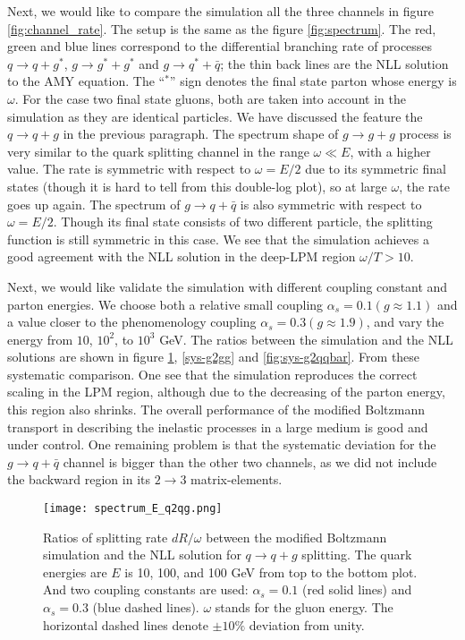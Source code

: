 Next, we would like to compare the simulation all the three channels in figure \ref{fig:channel_rate}.
The setup is the same as the figure \ref{fig:spectrum}.
The red, green and blue lines correspond to the differential branching rate of processes $q\rightarrow q+g^*$, $g\rightarrow g^*+g^*$ and $g\rightarrow q^*+\bar{q}$; the thin back lines are the NLL solution to the AMY equation.
The ``${}^*$'' sign denotes the final state parton whose energy is $\omega$.
For the case two final state gluons, both are taken into account in the simulation as they are identical particles.
We have discussed the feature the $q\rightarrow q+g$ in the previous paragraph. 
The spectrum shape of $g\rightarrow g+g$ process is very similar to the quark splitting channel in the range $\omega \ll E$, with a higher value.
The rate is symmetric with respect to $\omega = E/2$ due to its symmetric final states (though it is hard to tell from this double-log plot), so at large $\omega$, the rate goes up again.
The spectrum of $g\rightarrow q+\bar{q}$ is also symmetric with respect to $\omega = E/2$.
Though its final state consists of two different particle, the splitting function is still symmetric in this case.
We see that the simulation achieves a good agreement with the NLL solution in the deep-LPM region $\omega/T > 10$.

Next, we would like validate the simulation with different coupling constant and parton energies.
We choose both a relative small coupling $\alpha_s = 0.1 (g \approx 1.1)$ and a value closer to the phenomenology coupling $\alpha_s = 0.3 (g \approx 1.9)$, and vary the energy from $10$, $10^2$, to $10^3$ GeV.
The ratios between the simulation and the NLL solutions are shown in figure \ref{fig:sys-q2qg}, \ref{sys-g2gg} and \ref{fig:sys-g2qqbar}.
From these systematic comparison.
One see that the simulation reproduces the correct scaling in the LPM region, although due to the decreasing of the parton energy, this region also shrinks.
The overall performance of the modified Boltzmann transport in describing the inelastic processes in a large medium is good and under control.
One remaining problem is that the systematic deviation for the $g\rightarrow q+\bar{q}$ channel is bigger than the other two channels, as we did not include the backward region in its $2\rightarrow 3$ matrix-elements.

\begin{figure}
\centering
\texttt{[image: spectrum\_E\_q2qg.png]}
\caption{Ratios of splitting rate $dR/\omega$ between the modified Boltzmann simulation and the NLL solution for $q\rightarrow q+g$ splitting. The quark energies are $E$ is 10, 100, and 100 GeV from top to the bottom plot. 
And two coupling constants are used: $\alpha_s = 0.1$ (red solid lines) and $\alpha_s = 0.3$ (blue dashed lines).
$\omega$ stands for the gluon energy.
The horizontal dashed lines denote $\pm 10\%$ deviation from unity. }
\label{fig:sys-q2qg}
\end{figure}

